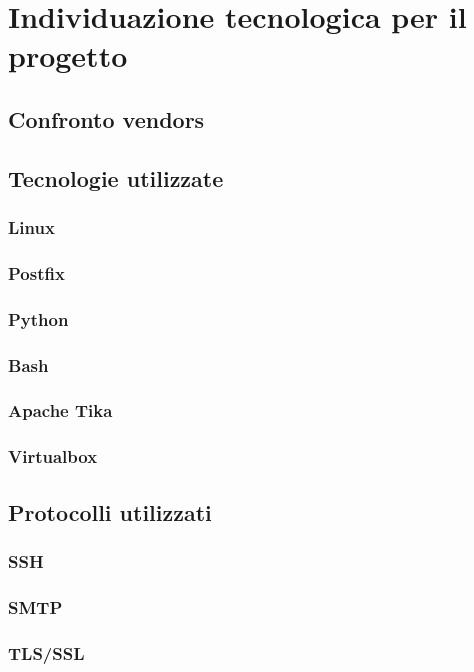 \chapter{Individuazione tecnologica per il progetto}

\section{Confronto vendors}

\section{Tecnologie utilizzate}
    \subsection{Linux}
    \subsection{Postfix}
    \subsection{Python}
    \subsection{Bash}
    \subsection{Apache Tika}
    \subsection{Virtualbox}

\section{Protocolli utilizzati}
    \subsection{SSH}
    \subsection{SMTP}
    \subsection{TLS/SSL}